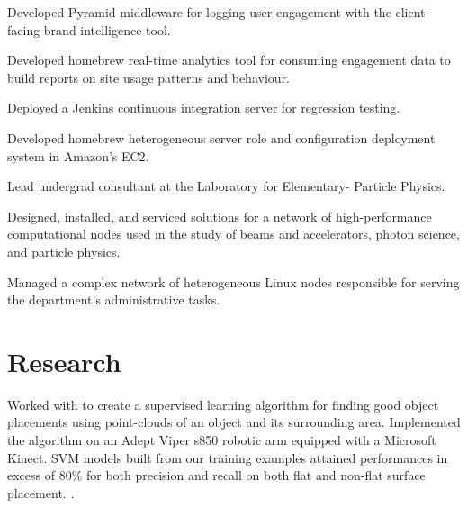 \documentclass[]{deedy-resume-openfont}
\begin{document}
\begin{minipage}[t]{0.66\textwidth}
\begin{tightemize}
                Developed Pyramid middleware for logging user engagement with
                the client-facing brand intelligence tool.
            \item
                Developed homebrew real-time analytics tool for consuming
                engagement data to build reports on site usage patterns and
                behaviour.
            \item
                Deployed a Jenkins continuous integration server for
                regression testing.
            \item
                Developed homebrew heterogeneous server role and configuration
                deployment system in Amazon’s EC2.
        \end{tightemize}
    \sectionsep

        \begin{tightemize}
            \item
                Lead undergrad consultant at the Laboratory for Elementary-
                Particle Physics.
            \item
                Designed, installed, and serviced solutions for a network of
                high-performance computational nodes used in the study of beams
                and accelerators, photon science, and particle physics.
            \item
                Managed a complex network of heterogeneous Linux nodes
                responsible for serving the department’s administrative tasks.
        \end{tightemize}
    \sectionsep

    \section{Research}
                Worked with  to create a supervised learning algorithm
                for finding good object placements using point-clouds of an object
                and its surrounding area. Implemented the algorithm on an Adept
                Viper s850 robotic arm equipped with a Microsoft Kinect. SVM models
                built from our training examples attained performances in excess of
                80\% for both precision and recall on both flat and non-flat
                surface placement.
                .
        \sectionsep


\end{minipage}
\end{document}
